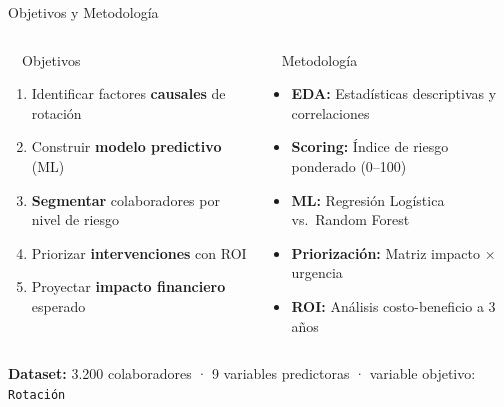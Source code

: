 \documentclass[aspectratio=169,12pt]{beamer}
\begin{document}
\begin{frame}{Objetivos y Metodología}
  \begin{columns}[T]
      \begin{block}{\faTarget\ \ Objetivos}
        \begin{enumerate}\setlength\itemsep{1pt}
          \item Identificar factores \textbf{causales} de rotación
          \item Construir \textbf{modelo predictivo} (ML)
          \item \textbf{Segmentar} colaboradores por nivel de riesgo
          \item Priorizar \textbf{intervenciones} con ROI
          \item Proyectar \textbf{impacto financiero} esperado
        \end{enumerate}
      \end{block}

      \begin{block}{\faCogs\ \ Metodología}
        \begin{itemize}\setlength\itemsep{1pt}
          \item \textbf{EDA:} Estadísticas descriptivas y correlaciones
          \item \textbf{Scoring:} Índice de riesgo ponderado (0--100)
          \item \textbf{ML:} Regresión Logística vs.\ Random Forest
          \item \textbf{Priorización:} Matriz impacto × urgencia
          \item \textbf{ROI:} Análisis costo-beneficio a 3 años
        \end{itemize}
      \end{block}
  \end{columns}
  \vspace{2pt}
  \begin{tcolorbox}[
    enhanced, colback=Cyan!8, colframe=Cyan,
    arc=3pt, boxrule=0.8pt, left=4pt, right=4pt, top=2pt, bottom=2pt
  ]
    {\color{NavyDeep}\small\bfseries Dataset:} {\small 3.200 colaboradores · 9 variables predictoras · variable objetivo: \texttt{Rotación}}
  \end{tcolorbox}
\end{frame}

\end{document}
